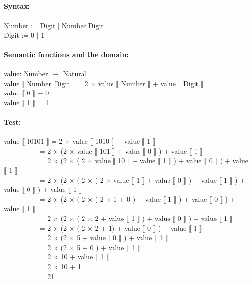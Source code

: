 \textbf{Syntax:}\\ \\
Number := Digit $|$ Number Digit \\
Digit := 0 $|$ 1\\ \\
\textbf{Semantic functions and the domain:}\\ \\
value: Number $\rightarrow$ Natural \\
value $\llbracket$ Number~Digit $\rrbracket$ = 2 $\times$ value $\llbracket$ Number $\rrbracket$ + value $\llbracket$ Digit $\rrbracket$ \\
value $\llbracket$ 0 $\rrbracket$ = 0 \\
value $\llbracket$ 1 $\rrbracket$ = 1 \\ \\
\textbf{Test:}\\ \\
value $\llbracket$ 10101 $\rrbracket$ = 2 $\times$ value $\llbracket$ 1010 $\rrbracket$  + value $\llbracket$ 1 $\rrbracket$ \\
$~~~~~~~~~~~~~~~~~~~~~~$ = 2 $\times$ (2 $\times$ value $\llbracket$ 101 $\rrbracket$ + value $\llbracket$ 0 $\rrbracket$ ) + value $\llbracket$ 1 $\rrbracket$ \\
$~~~~~~~~~~~~~~~~~~~~~~$ = 2 $\times$ (2 $\times$ ( 2 $\times$ value $\llbracket$ 10 $\rrbracket$ + value $\llbracket$ 1 $\rrbracket$ ) + value $\llbracket$ 0 $\rrbracket$ ) + value $\llbracket$ 1 $\rrbracket$ \\
$~~~~~~~~~~~~~~~~~~~~~~$ = 2 $\times$ (2 $\times$ ( 2 $\times$ ( 2 $\times$ value $\llbracket$ 1 $\rrbracket$ + value $\llbracket$ 0 $\rrbracket$ ) + value $\llbracket$ 1 $\rrbracket$ ) + value $\llbracket$ 0 $\rrbracket$ ) + value $\llbracket$ 1 $\rrbracket$ \\
$~~~~~~~~~~~~~~~~~~~~~~$ = 2 $\times$ (2 $\times$ ( 2 $\times$ ( 2 $\times$ 1 + 0 ) + value $\llbracket$ 1 $\rrbracket$ ) + value $\llbracket$ 0 $\rrbracket$ ) + value $\llbracket$ 1 $\rrbracket$ \\
$~~~~~~~~~~~~~~~~~~~~~~$ = 2 $\times$ (2 $\times$ ( 2 $\times$ 2 + value $\llbracket$ 1 $\rrbracket$ ) + value $\llbracket$ 0 $\rrbracket$ ) + value $\llbracket$ 1 $\rrbracket$ \\
$~~~~~~~~~~~~~~~~~~~~~~$ = 2 $\times$ (2 $\times$ ( 2 $\times$ 2 + 1) + value $\llbracket$ 0 $\rrbracket$ ) + value $\llbracket$ 1 $\rrbracket$ \\
$~~~~~~~~~~~~~~~~~~~~~~$ = 2 $\times$ (2 $\times$ 5 + value $\llbracket$ 0 $\rrbracket$ ) + value $\llbracket$ 1 $\rrbracket$ \\
$~~~~~~~~~~~~~~~~~~~~~~$ = 2 $\times$ (2 $\times$ 5 + 0 ) + value $\llbracket$ 1 $\rrbracket$ \\
$~~~~~~~~~~~~~~~~~~~~~~$ = 2 $\times$ 10 + value $\llbracket$ 1 $\rrbracket$ \\
$~~~~~~~~~~~~~~~~~~~~~~$ = 2 $\times$ 10 + 1 \\
$~~~~~~~~~~~~~~~~~~~~~~$ = 21

